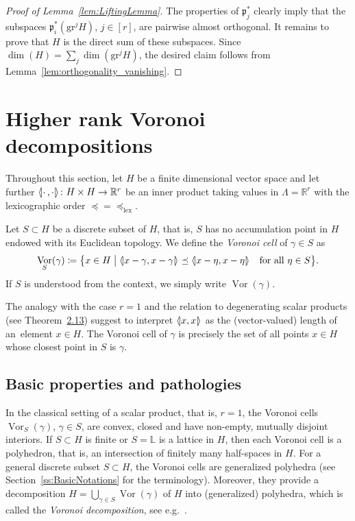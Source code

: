 \documentclass[10pt,a4paper]{amsart}
\newcommand{\llangle}{\mathopen{\langle\mkern -3.1mu\lvert}}
\newcommand{\rrangle}{\mathclose{\rvert\mkern -3.1mu\rangle}}
\newcommand{\highinn}[2]{{\llangle#2\rrangle_{#1}}}
\DeclareMathOperator{\Vor}{Vor}
\newcommand{\R}{\mathbb{R}}
\renewcommand{\L}{\mathbb{L}}
\newcommand{\grm}[2]{\mathrm{gr}_{#1}^{#2}}
\newcommand{\proj}{\mathfrak{p}}
\newcommand{\lexeq}{\preceq_{\mathrm{lex}}}
\renewcommand*{\to}{\mathchoice{\longrightarrow}{\rightarrow}{\rightarrow}{\rightarrow}}
\theoremstyle{definition}\newtheorem{defi}[cdrthm]{Definition}
\begin{document}
\begin{proof}[Proof of Lemma~\ref{lem:LiftingLemma}]
The properties of $\proj_j^*$ clearly imply that the subspaces $\proj_i^*(\grm{}{j}H)$, $j \in [r]$, are pairwise almost orthogonal. It remains to prove that $H$ is the direct sum of these subspaces. Since $\dim(H) = \sum_{j} \dim(\grm{}{j}H)$, the desired claim follows from Lemma~\ref{lem:orthogonality_vanishing}.
\end{proof}

\section{Higher rank Voronoi decompositions} \label{sec:HigherRankVoronoiDecompositions}
Throughout this section, let $H$ be a finite dimensional vector space and 
let further $\highinn{}{\cdot\, ,\cdot}\colon H\times H \to \R^r$ be an inner product taking values in $\Lambda = \R^r$ with the lexicographic order $\preceq=\lexeq$.

Let $S \subset H$ be a discrete subset of $H$, that is, $S$ has no accumulation point in $H$ endowed with its Euclidean topology. We define the \emph{Voronoi cell} of $\gamma \in S$ as
\begin{equation}\label{eq:DefinitionVoronoiCell}
\Vor_S(\gamma) \coloneqq \bigl\{x\in H \bigm| \highinn{}{x-\gamma, x- \gamma} \preceq \highinn{}{x-\eta, x-\eta} \quad\text{for all } \eta \in S\bigr\}.
\end{equation}
If $S$ is understood from the context, we simply write $\Vor(\gamma)$.


The analogy with the case $r = 1$ and the relation to degenerating scalar products (see Theorem~\href{https://ahl.centre-mersenne.org/articles/10.5802/ahl.257/}{2.13}) suggest to interpret $\highinn{}{x, x}$ as the (vector-valued) length of an~element $x \in H$. The Voronoi cell of $\gamma$ is precisely the set of all points $x \in H$ whose closest point in $S$ is $\gamma$.


\subsection{Basic properties and pathologies} \label{ss:Pathologies}
In the classical setting of a scalar product, that is, $r=1$, the Voronoi cells $\Vor_S(\gamma)$, $\gamma \in S$, are convex, closed and have non-empty, mutually disjoint interiors. If $S \subset H$ is finite or $S= \L$ is a lattice in $H$, then each Voronoi cell is a polyhedron, that is, an intersection of finitely many half-spaces in $H$. For a general discrete subset $S \subset H$, the Voronoi cells are generalized polyhedra (see Section~\ref{ss:BasicNotations} for the terminology). Moreover, they provide a decomposition $H = \bigcup_{\gamma \in S} \Vor(\gamma)$ of $H$ into (generalized) polyhedra, which is called the \emph{Voronoi decomposition}, see e.g.~\cite[p.~465]{Gruber}.
\end{document}

